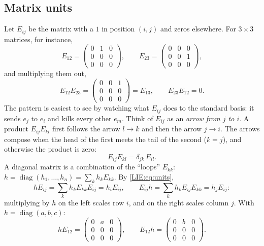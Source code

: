 \subsection*{Matrix units}
Let $E_{ij}$ be the matrix with a $1$ in position $(i,j)$ and zeros elsewhere. For $3\times3$ matrices,
for instance,
\[
  E_{12}=\begin{pmatrix}0&1&0\\0&0&0\\0&0&0\end{pmatrix},\qquad
  E_{23}=\begin{pmatrix}0&0&0\\0&0&1\\0&0&0\end{pmatrix},
\]
and multiplying them out,
\[
  E_{12}E_{23}=\begin{pmatrix}0&0&1\\0&0&0\\0&0&0\end{pmatrix}=E_{13},\qquad
  E_{23}E_{12}=0 .
\]
The pattern is easiest to see by watching what $E_{ij}$ does to the standard basis: it sends $e_j$ to
$e_i$ and kills every other $e_m$. Think of $E_{ij}$ as an \emph{arrow from $j$ to $i$}. A product
$E_{ij}E_{kl}$ first follows the arrow $l\to k$ and then the arrow $j\to i$. The arrows compose when
the head of the first meets the tail of the second ($k=j$), and otherwise the product is zero:
\begin{equation}\label{LIE:eq:units}
  E_{ij}E_{kl}=\delta_{jk}\,E_{il}.
\end{equation}
A diagonal matrix is a combination of the ``loops'' $E_{kk}$:
$h=\operatorname{diag}(h_1,\dots,h_n)=\sum_kh_kE_{kk}$. By \eqref{LIE:eq:units},
\[
  hE_{ij}=\sum_kh_kE_{kk}E_{ij}=h_iE_{ij},\qquad E_{ij}h=\sum_kh_kE_{ij}E_{kk}=h_jE_{ij}:
\]
multiplying by $h$ on the left scales row $i$, and on the right scales column $j$. With
$h=\operatorname{diag}(a,b,c)$:
\[
  hE_{12}=\begin{pmatrix}0&a&0\\0&0&0\\0&0&0\end{pmatrix},\qquad
  E_{12}h=\begin{pmatrix}0&b&0\\0&0&0\\0&0&0\end{pmatrix}.
\]

